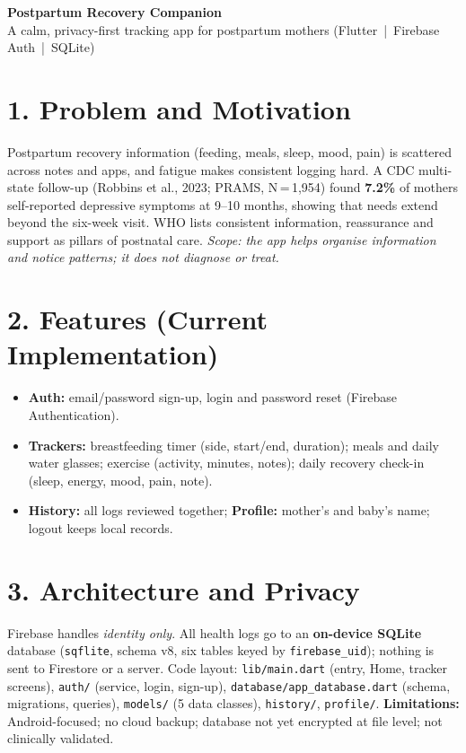 \documentclass[10pt,a4paper]{article}
\begin{document}
\begin{center}
  {\Large\bfseries\color{brand} Postpartum Recovery Companion}\\[2pt]
  {\small A calm, privacy-first tracking app for postpartum mothers (Flutter \,|\, Firebase Auth \,|\, SQLite)}
\end{center}

\section{1. Problem and Motivation}
Postpartum recovery information (feeding, meals, sleep, mood, pain) is scattered across notes and apps, and fatigue makes consistent logging hard.
A CDC multi-state follow-up (Robbins et al., 2023; PRAMS, N\,=\,1{,}954) found \textbf{7.2\%} of mothers self-reported depressive symptoms at 9--10 months, showing that needs extend beyond the six-week visit.
WHO lists consistent information, reassurance and support as pillars of postnatal care.
\textit{Scope: the app helps organise information and notice patterns; it does not diagnose or treat.}

\section{2. Features (Current Implementation)}
\begin{itemize}
  \item \textbf{Auth:} email/password sign-up, login and password reset (Firebase Authentication).
  \item \textbf{Trackers:} breastfeeding timer (side, start/end, duration); meals and daily water glasses; exercise (activity, minutes, notes); daily recovery check-in (sleep, energy, mood, pain, note).
  \item \textbf{History:} all logs reviewed together; \textbf{Profile:} mother's and baby's name; logout keeps local records.
\end{itemize}

\section{3. Architecture and Privacy}
Firebase handles \emph{identity only}. All health logs go to an \textbf{on-device SQLite} database (\texttt{sqflite}, schema v8, six tables keyed by \texttt{firebase\_uid}); nothing is sent to Firestore or a server.
Code layout: \texttt{lib/main.dart} (entry, Home, tracker screens), \texttt{auth/} (service, login, sign-up), \texttt{database/app\_database.dart} (schema, migrations, queries), \texttt{models/} (5 data classes), \texttt{history/}, \texttt{profile/}.
\textbf{Limitations:} Android-focused; no cloud backup; database not yet encrypted at file level; not clinically validated.
\end{document}

